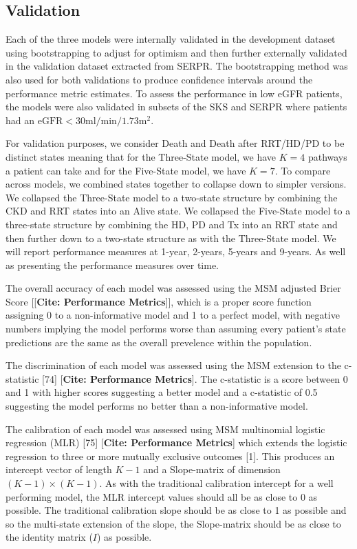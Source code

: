 \documentclass[12pt,twoside]{reedthesis}
\begin{document}
\hypertarget{validation}{%
\subsection{Validation}\label{validation}}

Each of the three models were internally validated in the development dataset using bootstrapping to adjust for optimism and then further externally validated in the validation dataset extracted from SERPR. The bootstrapping method was also used for both validations to produce confidence intervals around the performance metric estimates. To assess the performance in low eGFR patients, the models were also validated in subsets of the SKS and SERPR where patients had an \(\textrm{eGFR} < 30\textrm{ml}/\textrm{min}/1.73\textrm{m}^2\).

For validation purposes, we consider Death and Death after RRT/HD/PD to be distinct states meaning that for the Three-State model, we have \(K=4\) pathways a patient can take and for the Five-State model, we have \(K=7\). To compare across models, we combined states together to collapse down to simpler versions. We collapsed the Three-State model to a two-state structure by combining the CKD and RRT states into an Alive state. We collapsed the Five-State model to a three-state structure by combining the HD, PD and Tx into an RRT state and then further down to a two-state structure as with the Three-State model. We will report performance measures at 1-year, 2-years, 5-years and 9-years. As well as presenting the performance measures over time.

The overall accuracy of each model was assessed using the MSM adjusted Brier Score {[}{[}\textbf{Cite: Performance Metrics}{]}{]}, which is a proper score function assigning 0 to a non-informative model and 1 to a perfect model, with negative numbers implying the model performs worse than assuming every patient's state predictions are the same as the overall prevelence within the population.

The discrimination of each model was assessed using the MSM extension to the c-statistic {[}74{]} {[}\textbf{Cite: Performance Metrics}{]}. The c-statistic is a score between 0 and 1 with higher scores suggesting a better model and a c-statistic of 0.5 suggesting the model performs no better than a non-informative model.

The calibration of each model was assessed using MSM multinomial logistic regression (MLR) {[}75{]} {[}\textbf{Cite: Performance Metrics}{]} which extends the logistic regression to three or more mutually exclusive outcomes {[}1{]}. This produces an intercept vector of length \(K-1\) and a Slope-matrix of dimension \((K-1) \times (K-1)\). As with the traditional calibration intercept for a well performing model, the MLR intercept values should all be as close to 0 as possible. The traditional calibration slope should be as close to 1 as possible and so the multi-state extension of the slope, the Slope-matrix should be as close to the identity matrix (\(I\)) as possible.
\end{document}
